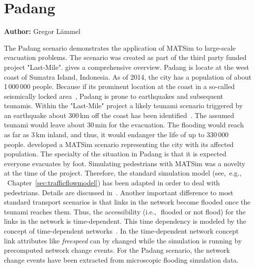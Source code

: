 \section{Padang}
\label{sec:padang}
\hfill \textbf{Author:} Gregor Lämmel

The Padang scenario demonstrates the application of MATSim to large-scale evacuation problems. The scenario was created as part of the third party funded project "Last-Mile". \citet{TaubenboeckEtAl2012ConcludingLastMilePaperNatHazards} gives a comprehensive overview.
Padang is locate at the west coast of Sumatra Island, Indonesia. As of 2014, the city has a population of about 1\,000\,000 people. 
Because if its prominent location at the coast in a so-called seismically locked area~\citep{McCloskey2010Padang2009Earthquake}, Padang is prone to earthquakes and subsequent tsunamis. Within the "Last-Mile" project a likely tsunami scenario triggered by an earthquake about 300\,km off the coast has been identified~\citep{GosebergSchlurmann2009HazardMappingPadang}. The assumed tsunami would leave about 30\,min for the evacuation. The flooding would reach as far as 3\,km inland, and thus, it would endanger the life of up to 330\,000 people. \citet{Laemmel_PhDThesis_2011} developed a MATSim scenario representing the city with its affected population. The specialty of the situation in Padang is that it is expected everyone evacuates by foot. Simulating pedestrians with MATSim was a novelty at the time of the project. Therefore, the standard simulation model (see,~e.g.,\,~Chapter~\ref{sec:trafficflowmodel}) has been adapted in order to deal with pedestrians. 
Details are discussed in~\citet{LaemmelKluepfelNagel2009EvacPadangAtBookTimmermanns}. Another important difference to most standard transport scenarios is that links in the network become flooded once the tsunami reaches them. Thus, the accessibility (i.e.,\,~flooded or not flood) for the links in the network is time-dependent. This time dependency is modeled by the concept of time-dependent networks~\citep{LaemmelEtAl_TransResC_2010}. In the time-dependent network concept link attributes like \emph{freespeed} can by changed while the simulation is running by precomputed network change events. For the Padang scenario, the network change events have been extracted from microscopic flooding simulation data.
